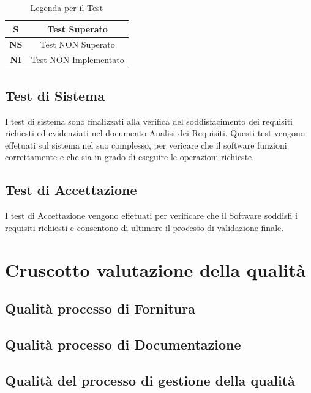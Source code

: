 \documentclass{article}
\begin{document}
\begin{table}[H]
    \centering
    \renewcommand{\arraystretch}{1.5}
\begin{tabular}{|c|c|}
    \hline
    \textbf{S} & Test Superato \\
    \hline
    \textbf{NS} & Test NON Superato \\
    \hline
    \textbf{NI} & Test NON Implementato \\
    \hline
\end{tabular}
\caption{Legenda per il Test}
\end{table}


\subsection{Test di Sistema} %
I test di sistema sono finalizzati alla verifica del soddisfacimento dei requisiti richiesti ed evidenziati nel documento
Analisi dei Requisiti. Questi test vengono effetuati sul sistema nel suo complesso, per vericare che il software funzioni correttamente
e che sia in grado di eseguire le operazioni richieste.

\subsection{Test di Accettazione} %
I test di Accettazione vengono effetuati per verificare che il Software soddisfi i requisiti richiesti e consentono di ultimare il processo di validazione finale.

\section{Cruscotto valutazione della qualità}


\subsection{Qualità processo di Fornitura}


\subsection{Qualità processo di Documentazione}


\subsection{Qualità del processo di gestione della qualità}
\end{document}
